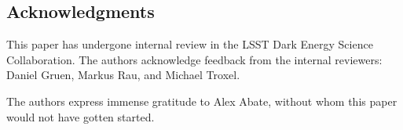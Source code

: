 \documentclass[\docopts]{\docclass}
\begin{document}









\subsection*{Acknowledgments}


This paper has undergone internal review in the LSST Dark Energy Science Collaboration.
The authors acknowledge feedback from the internal reviewers: Daniel Gruen, Markus Rau, and Michael Troxel. %




The authors express immense gratitude to Alex Abate, without whom this paper would not have gotten started.
\end{document}
